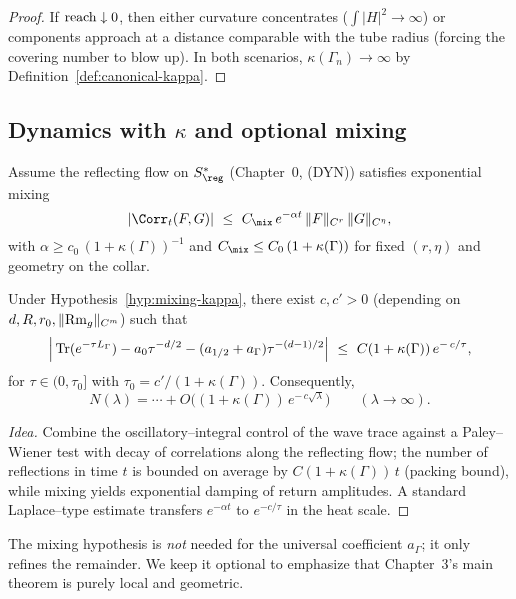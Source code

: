 \begin{proof}
If $\operatorname{reach}\downarrow 0$, then either curvature concentrates ($\int |H|^2\to\infty$) or components approach at a distance comparable with the tube radius (forcing the covering number to blow up). In both scenarios, $\kappa(\Gamma_n)\to\infty$ by Definition~\ref{def:canonical-kappa}.
\end{proof}

\subsection{Dynamics with $\kappa$ and optional mixing}
\label{subsec:dynamics-kappa}

\begin{hypothesis}
\label{hyp:mixing-kappa}
Assume the reflecting flow on $S^*_{\reg}$ (Chapter~0, (DYN)) satisfies exponential mixing
\[
|\Corr_t(F,G)|\ \le\ C_{\mix}\,e^{-\alpha t}\,\|F\|_{C^r}\,\|G\|_{C^\eta},
\]
with $\alpha\ge c_0\,(1+\kappa(\Gamma))^{-1}$ and $C_{\mix}\le C_0\,(1+\kappa(\Gamma))$ for fixed $(r,\eta)$ and geometry on the collar.
\end{hypothesis}

\begin{proposition}
\label{prop:mixing-improves}
Under Hypothesis~\ref{hyp:mixing-kappa}, there exist $c,c'>0$ (depending on $d,R,r_0,\|{\rm Rm}_g\|_{C^m}$) such that
\[
\Big|\operatorname{Tr}(e^{-\tau L_\Gamma})-a_0\tau^{-d/2}-(a_{1/2}+a_\Gamma)\tau^{-(d-1)/2}\Big|
\ \le\ C(1+\kappa(\Gamma))\,e^{-\,c/\tau},
\]
for $\tau\in(0,\tau_0]$ with $\tau_0=c'/(1+\kappa(\Gamma))$.
Consequently,
\[
N(\lambda)=\cdots+O\!\big((1+\kappa(\Gamma))\,e^{-\,c\sqrt{\lambda}}\big)\qquad(\lambda\to\infty).
\]
\end{proposition}

\begin{proof}[Idea]
Combine the oscillatory–integral control of the wave trace against a Paley–Wiener test with decay of correlations along the reflecting flow; the number of reflections in time $t$ is bounded on average by $C(1+\kappa(\Gamma))\,t$ (packing bound), while mixing yields exponential damping of return amplitudes. A standard Laplace–type estimate transfers $e^{-\alpha t}$ to $e^{-c/\tau}$ in the heat scale.
\end{proof}

\begin{remark}
The mixing hypothesis is \emph{not} needed for the universal coefficient $a_\Gamma$; it only refines the remainder. We keep it optional to emphasize that Chapter~3’s main theorem is purely local and geometric.
\end{remark}

